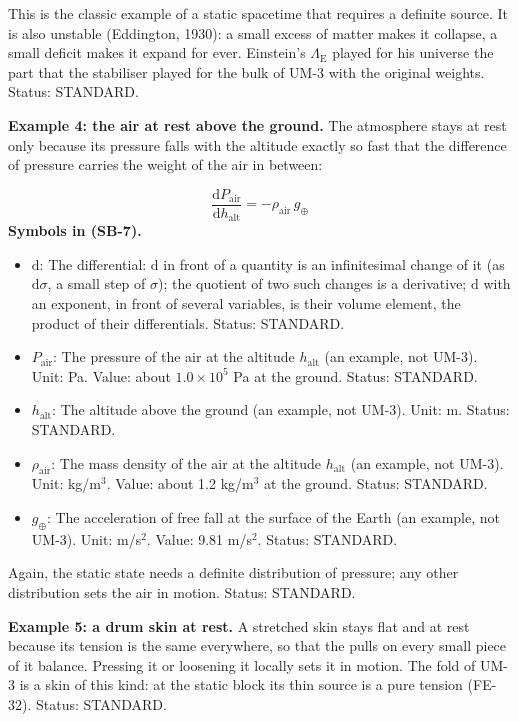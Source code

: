 \documentclass[
  10pt,
]{article}
\providecommand{\tightlist}{%
  \setlength{\itemsep}{0pt}\setlength{\parskip}{0pt}}
\begin{document}
This is the classic example of a static spacetime that requires a
definite source. It is also unstable (Eddington, 1930): a small excess
of matter makes it collapse, a small deficit makes it expand for ever.
Einstein's \(\Lambda_{\mathrm{E}}\) played for his universe the part
that the stabiliser played for the bulk of UM-3 with the original
weights. Status: STANDARD.

\textbf{Example 4: the air at rest above the ground.} The atmosphere
stays at rest only because its pressure falls with the altitude exactly
so fast that the difference of pressure carries the weight of the air in
between:

\[
\frac{\mathrm{d}P_{\mathrm{air}}}{\mathrm{d}h_{\mathrm{alt}}} = -\rho_{\mathrm{air}}\,g_{\oplus} \tag{SB-7}
\] \textbf{Symbols in (SB-7).}

\begin{itemize}
\tightlist
\item
  \(\mathrm{d}\): The differential: \(\mathrm{d}\) in front of a
  quantity is an infinitesimal change of it (as \(\mathrm{d}\sigma\), a
  small step of \(\sigma\)); the quotient of two such changes is a
  derivative; \(\mathrm{d}\) with an exponent, in front of several
  variables, is their volume element, the product of their
  differentials. Status: STANDARD.
\item
  \(P_{\mathrm{air}}\): The pressure of the air at the altitude
  \(h_{\mathrm{alt}}\) (an example, not UM-3). Unit: Pa. Value: about
  \(1.0\times10^5\) Pa at the ground. Status: STANDARD.
\item
  \(h_{\mathrm{alt}}\): The altitude above the ground (an example, not
  UM-3). Unit: m. Status: STANDARD.
\item
  \(\rho_{\mathrm{air}}\): The mass density of the air at the altitude
  \(h_{\mathrm{alt}}\) (an example, not UM-3). Unit: kg/m\(^3\). Value:
  about 1.2 kg/m\(^3\) at the ground. Status: STANDARD.
\item
  \(g_{\oplus}\): The acceleration of free fall at the surface of the
  Earth (an example, not UM-3). Unit: m/s\(^2\). Value: 9.81 m/s\(^2\).
  Status: STANDARD.
\end{itemize}

Again, the static state needs a definite distribution of pressure; any
other distribution sets the air in motion. Status: STANDARD.

\textbf{Example 5: a drum skin at rest.} A stretched skin stays flat and
at rest because its tension is the same everywhere, so that the pulls on
every small piece of it balance. Pressing it or loosening it locally
sets it in motion. The fold of UM-3 is a skin of this kind: at the
static block its thin source is a pure tension (FE-32). Status:
STANDARD.
\end{document}
